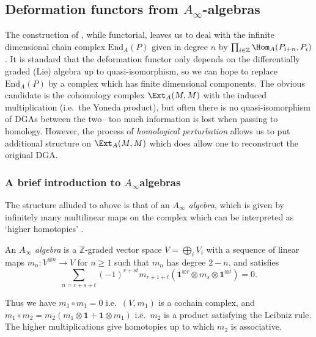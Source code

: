 \subsection{Deformation functors from \texorpdfstring{\(A_\infty\)}{Ainfty}-algebras}
The construction of , while functorial, leaves us to deal
with the infinite dimensional chain complex \(\text{End}_A(P)\) given in degree
\(n\) by \(\prod_{i\in \mathbb{Z}}\Hom_A(P_{i+n},P_i)\). It is standard that the
deformation functor only depends on the differentially graded (Lie) algebra up
to quasi-isomorphism, so we can hope to replace \(\text{End}_A(P)\) by a complex
which has finite dimensional components.  The obvious
candidate is the cohomology complex \(\Ext_A(M,M)\) with the induced
multiplication (i.e.\ the Yoneda product), but often there is no
quasi-isomorphism of DGAs between the two-- too much information is lost when
passing to homology. However, the process of \textit{homological perturbation}
allows us to put additional structure on \(\Ext_A(M,M)\) which does allow one to
reconstruct the original DGA.

\subsubsection{A brief introduction to \(A_\infty\)algebras} The structure
alluded to above is that of an \textit{\(A_\infty\) algebra}, which is given by
infinitely many multilinear maps on the complex which can be interpreted as
`higher homotopies' \cite[see][Appendix A for the geometric
motivation]{segal__2008}.

\begin{definition} 
    An \textit{\(A_\infty\) algebra} is a \(\mathbb{Z}\)-graded vector space
    \(V=\bigoplus_i V_i\) with a sequence of linear maps \(m_n : V^{\otimes
    n}\rightarrow V\) for \(n\geq 1\) such that \(m_n\) has degree \(2-n\), and
    satisfies
    \begin{equation}\label{Ainftymult}
        \sum_{n=r+s+t}(-1)^{r+st}m_{r+1+t}(\mathbold{1}^{\otimes r}\otimes m_s
        \otimes \mathbold{1}^{\otimes t}) = 0.
    \end{equation}
\end{definition}

Thus we have \(m_1\circ m_1=0\) i.e.\ \((V,m_1)\) is a cochain complex, and
\(m_1\circ m_2 = m_2(m_1\otimes \mathbold{1} + \mathbold{1}\otimes m_1)\) i.e.\
\(m_2\) is a product satisfying the Leibniz rule. The higher multiplications
give homotopies up to which \(m_2\) is associative. 

